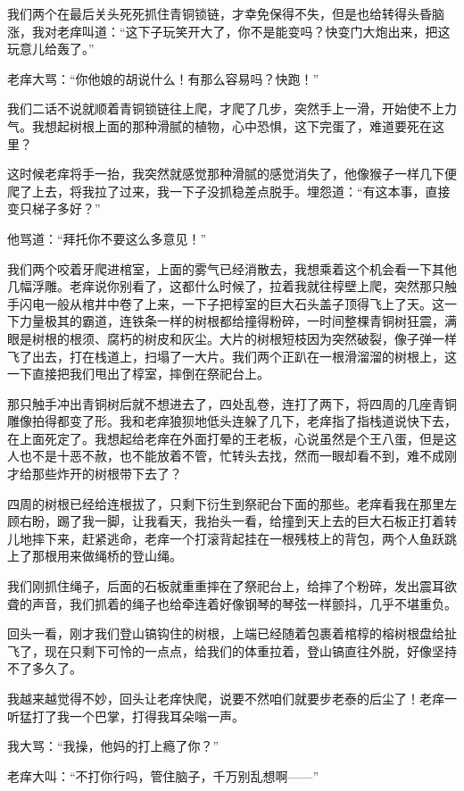 我们两个在最后关头死死抓住青铜锁链，才幸免保得不失，但是也给转得头昏脑涨，我对老痒叫道：“这下子玩笑开大了，你不是能变吗？快变门大炮出来，把这玩意儿给轰了。”

老痒大骂：“你他娘的胡说什么！有那么容易吗？快跑！”

我们二话不说就顺着青铜锁链往上爬，才爬了几步，突然手上一滑，开始使不上力气。我想起树根上面的那种滑腻的植物，心中恐惧，这下完蛋了，难道要死在这里？

这时候老痒将手一抬，我突然就感觉那种滑腻的感觉消失了，他像猴子一样几下便爬了上去，将我拉了过来，我一下子没抓稳差点脱手。埋怨道：“有这本事，直接变只梯子多好？”

他骂道：“拜托你不要这么多意见！”

我们两个咬着牙爬进棺室，上面的雾气已经消散去，我想乘着这个机会看一下其他几幅浮雕。老痒说你别看了，这都什么时候了，拉着我就往椁壁上爬，突然那只触手闪电一般从棺井中卷了上来，一下子把椁室的巨大石头盖子顶得飞上了天。这一下力量极其的霸道，连铁条一样的树根都给撞得粉碎，一时间整棵青铜树狂震，满眼是树根的根须、腐朽的树皮和灰尘。大片的树根短枝因为突然破裂，像子弹一样飞了出去，打在栈道上，扫塌了一大片。我们两个正趴在一根滑溜溜的树根上，这一下直接把我们甩出了椁室，摔倒在祭祀台上。

那只触手冲出青铜树后就不想进去了，四处乱卷，连打了两下，将四周的几座青铜雕像拍得都变了形。我和老痒狼狈地低头连躲了几下，老痒指了指栈道说快下去，在上面死定了。我想起给老痒在外面打晕的王老板，心说虽然是个王八蛋，但是这人也不是十恶不赦，也不能放着不管，忙转头去找，然而一眼却看不到，难不成刚才给那些炸开的树根带下去了？

四周的树根已经给连根拔了，只剩下衍生到祭祀台下面的那些。老痒看我在那里左顾右盼，踢了我一脚，让我看天，我抬头一看，给撞到天上去的巨大石板正打着转儿地摔下来，赶紧逃命，老痒一个打滚背起挂在一根残枝上的背包，两个人鱼跃跳上了那根用来做绳桥的登山绳。

我们刚抓住绳子，后面的石板就重重摔在了祭祀台上，给摔了个粉碎，发出震耳欲聋的声音，我们抓着的绳子也给牵连着好像钢琴的琴弦一样颤抖，几乎不堪重负。

回头一看，刚才我们登山镐钩住的树根，上端已经随着包裹着棺椁的榕树根盘给扯飞了，现在只剩下可怜的一点点，给我们的体重拉着，登山镐直往外脱，好像坚持不了多久了。

我越来越觉得不妙，回头让老痒快爬，说要不然咱们就要步老泰的后尘了！老痒一听猛打了我一个巴掌，打得我耳朵嗡一声。

我大骂：“我操，他妈的打上瘾了你？”

老痒大叫：“不打你行吗，管住脑子，千万别乱想啊——”

